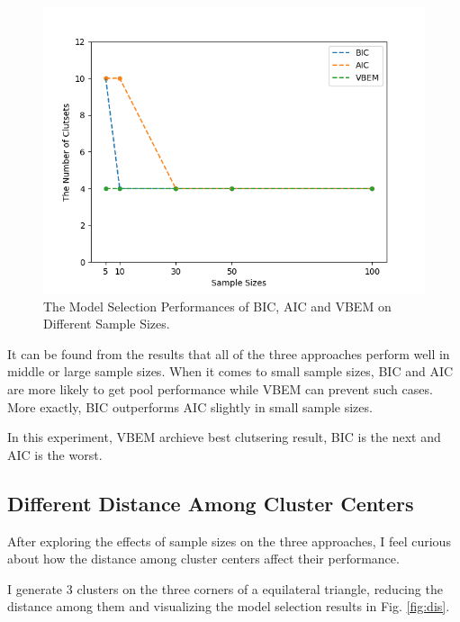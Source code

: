 \documentclass[12pt,a4paper]{article}
\theoremstyle{definition}
\begin{document}
\begin{figure}[H]
	\centering
	\includegraphics[width=0.5\linewidth]{demo/sample_line.png}
	\caption{The Model Selection Performances of BIC, AIC and VBEM on Different Sample Sizes.}
	\label{fig:sample_line}
\end{figure}

It can be found from the results that all of the three approaches perform well in middle or large sample sizes. When it comes to small sample sizes, BIC and AIC are more likely to  get pool performance while VBEM can prevent such cases. More exactly, BIC outperforms AIC slightly in small sample sizes.

In this experiment, VBEM archieve best clutsering result, BIC is the next and AIC is the worst.

\subsection{Different Distance Among Cluster Centers}
\label{sec:2}

After exploring the effects of sample sizes on the three approaches, I feel curious about how the distance among cluster centers affect their performance.

I generate 3 clusters on the three corners of a  equilateral triangle, reducing the distance among them and visualizing the model selection results in Fig. \ref{fig:dis}.
\end{document}
